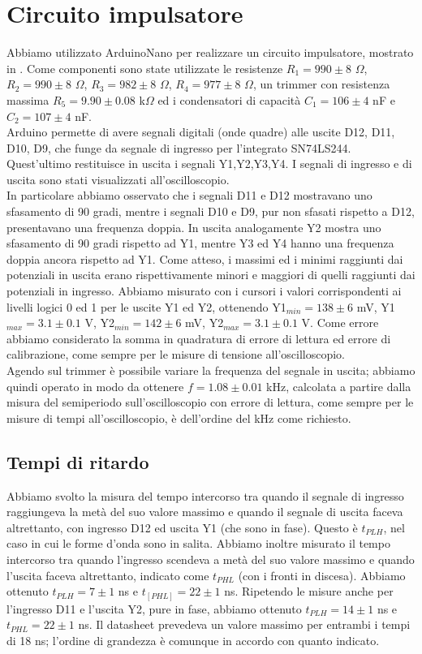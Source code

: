 \section{Circuito impulsatore}
Abbiamo utilizzato ArduinoNano per realizzare un circuito impulsatore, mostrato in . Come componenti sono state utilizzate le resistenze $R_1 = 990 \pm 8$ $\Omega$, $R_2 = 990 \pm 8$ $\Omega$, $R_3 = 982 \pm 8$ $\Omega$, $R_4 = 977 \pm 8$ $\Omega$, un trimmer con resistenza massima $R_5 = 9.90 \pm 0.08$ k$\Omega$ ed i condensatori di capacità $C_1 = 106 \pm 4$ nF e $C_2 = 107 \pm 4$ nF.\\
Arduino permette di avere segnali digitali (onde quadre) alle uscite D12, D11, D10, D9, che funge da segnale di ingresso per l'integrato SN74LS244. Quest'ultimo restituisce in uscita i segnali Y1,Y2,Y3,Y4. I segnali di ingresso e di uscita sono stati visualizzati all'oscilloscopio.\\
In particolare abbiamo osservato che i segnali D11 e D12 mostravano uno sfasamento di 90 gradi, mentre i segnali D10 e D9, pur non sfasati rispetto a D12, presentavano una frequenza doppia. In uscita analogamente Y2 mostra uno sfasamento di 90 gradi rispetto ad Y1, mentre Y3 ed Y4 hanno una frequenza doppia ancora rispetto ad Y1. Come atteso, i massimi ed i minimi raggiunti dai potenziali in uscita erano rispettivamente minori e maggiori di quelli raggiunti dai potenziali in ingresso. Abbiamo misurato con i cursori i valori corrispondenti ai livelli logici 0 ed 1 per le uscite Y1 ed Y2, ottenendo Y1$_{min} = 138 \pm 6$ mV, Y1$_{max} = 3.1 \pm 0.1$ V, Y2$_{min} = 142 \pm 6$ mV, Y2$_{max} = 3.1 \pm 0.1$ V. Come errore abbiamo considerato la somma in quadratura di errore di lettura ed errore di calibrazione, come sempre per le misure di tensione all'oscilloscopio.\\
Agendo sul trimmer è possibile variare la frequenza del segnale in uscita; abbiamo quindi operato in modo da ottenere $f = 1.08 \pm 0.01$ kHz, calcolata a partire dalla misura del semiperiodo sull'oscilloscopio con errore di lettura, come sempre per le misure di tempi all'oscilloscopio, è dell'ordine del kHz come richiesto.
\subsection{Tempi di ritardo}
Abbiamo svolto la misura del tempo intercorso tra quando il segnale di ingresso raggiungeva la metà del suo valore massimo e quando il segnale di uscita faceva altrettanto, con ingresso D12 ed uscita Y1 (che sono in fase). Questo è $t_{PLH}$, nel caso in cui le forme d'onda sono in salita. Abbiamo inoltre misurato il tempo intercorso tra quando l'ingresso scendeva a metà del suo valore massimo e quando l'uscita faceva altrettanto, indicato come $t_{PHL}$ (con i fronti in discesa). Abbiamo ottenuto $t_{PLH} = 7 \pm 1$ ns e $t_[PHL] = 22 \pm 1$ ns. Ripetendo le misure anche per l'ingresso D11 e l'uscita Y2, pure in fase, abbiamo ottenuto $t_{PLH} = 14 \pm 1$ ns e $t_{PHL} = 22 \pm 1$ ns. Il datasheet prevedeva un valore massimo per entrambi i tempi di 18 ns; l'ordine di grandezza è comunque in accordo con quanto indicato.
